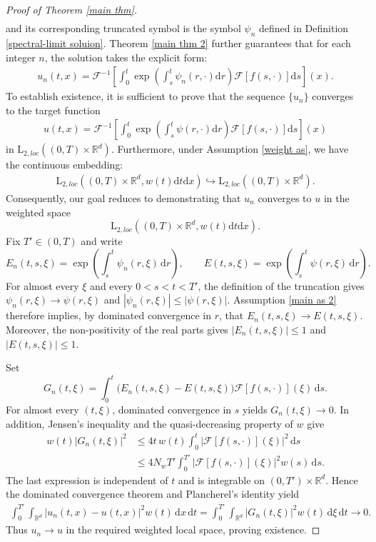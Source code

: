\documentclass[11pt,reqno]{amsart}
\theoremstyle{definition}
\theoremstyle{remark}
\newcommand\bR{\mathbb{R}}
\newcommand\cF{\mathcal{F}}
\numberwithin{equation}{section}
\begin{document}
\begin{proof}[Proof of Theorem \ref{main thm}]
\begin{align*}
\end{align*}
and its corresponding truncated symbol is the symbol $\psi_n$ defined in Definition \ref{spectral-limit soluion}.
Theorem \ref{main thm 2} further guarantees that for each integer $n$, the solution takes the explicit form:
\begin{align*}
u_n(t,x)=  \cF^{-1}\left[ \int_0^t  \exp\left(\int_s^t\psi_n(r,\cdot)\mathrm{d}r \right) \cF[f(s,\cdot)]\mathrm{d}s \right](x).
\end{align*}
To establish existence, it is sufficient to prove that the sequence $\{u_n\}$ converges to the target function
\begin{align*}
u(t,x)=  \cF^{-1}\left[ \int_0^t  \exp\left(\int_s^t\psi(r,\cdot)\mathrm{d}r \right) \cF[f(s,\cdot)]\mathrm{d}s \right](x)
\end{align*}
in $\mathrm{L}_{2,loc}\left( (0,T) \times \bR^d\right)$.
Furthermore, under Assumption \ref{weight as}, we have the continuous embedding:
\begin{align}
										\label{20260324 50}
\mathrm{L}_{2,loc}\left( (0,T) \times \bR^d, w(t)\mathrm{d}t \mathrm{d}x \right) \hookrightarrow \mathrm{L}_{2,loc}\left( (0,T) \times \bR^d\right).
\end{align}
Consequently, our goal reduces to demonstrating that $u_n$ converges to $u$ in the weighted space 
$$
\mathrm{L}_{2,loc}\left( (0,T) \times \bR^d, w(t)\mathrm{d}t \mathrm{d}x \right).
$$
Fix $T'\in(0,T)$ and write
\[
E_n(t,s,\xi)=\exp\left(\int_s^t\psi_n(r,\xi)\,\mathrm{d}r\right),
\qquad
E(t,s,\xi)=\exp\left(\int_s^t\psi(r,\xi)\,\mathrm{d}r\right).
\]
For almost every $\xi$ and every $0<s<t<T'$, the definition of the truncation gives $\psi_n(r,\xi)\to\psi(r,\xi)$ and $|\psi_n(r,\xi)|\leq|\psi(r,\xi)|$. Assumption \ref{main as 2} therefore implies, by dominated convergence in $r$, that $E_n(t,s,\xi)\to E(t,s,\xi)$. Moreover, the non-positivity of the real parts gives $|E_n(t,s,\xi)|\leq1$ and $|E(t,s,\xi)|\leq1$.

Set
\[
G_n(t,\xi)=\int_0^t\bigl(E_n(t,s,\xi)-E(t,s,\xi)\bigr)\cF[f(s,\cdot)](\xi)\,\mathrm{d}s.
\]
For almost every $(t,\xi)$, dominated convergence in $s$ yields $G_n(t,\xi)\to0$. In addition, Jensen's inequality and the quasi-decreasing property of $w$ give
\begin{align*}
w(t)|G_n(t,\xi)|^2
&\leq 4t\,w(t)\int_0^t|\cF[f(s,\cdot)](\xi)|^2\,\mathrm{d}s\\
&\leq 4N_wT'\int_0^{T'}|\cF[f(s,\cdot)](\xi)|^2w(s)\,\mathrm{d}s.
\end{align*}
The last expression is independent of $t$ and is integrable on $(0,T')\times\bR^d$. Hence the dominated convergence theorem and Plancherel's identity yield
\begin{align*}
\int_0^{T'}\int_{\bR^d}|u_n(t,x)-u(t,x)|^2w(t)\,\mathrm{d}x\,\mathrm{d}t
=\int_0^{T'}\int_{\bR^d}|G_n(t,\xi)|^2w(t)\,\mathrm{d}\xi\,\mathrm{d}t
\longrightarrow0.
\end{align*}
Thus $u_n\to u$ in the required weighted local space, proving existence.





\end{proof}
\end{document}
